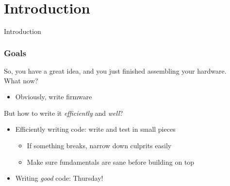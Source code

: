 \documentclass{beamer}
\begin{document}
\begin{frame}
\titlepage

\setcounter{tocdepth}{1}
\tableofcontents
\end{frame}

\section{Introduction} %
\begin{frame}
\centering \huge Introduction
\end{frame}

\begin{frame}
\frametitle{Goals}
So, you have a great idea, and you just finished assembling your hardware. \\
What now?
 {
\begin{itemize}
  \item Obviously, write firmware
\end{itemize}
\hfill\break
But how to write it \textit{efficiently} and \textit{well}?
}
 {
\begin{itemize}
  \item Efficiently writing code: write and test in small pieces
  \begin{itemize}
    \item If something breaks, narrow down culprits easily
    \item Make sure fundamentals are sane before building on top
  \end{itemize}
  \item Writing \textit{good} code: Thursday!
\end{itemize}
}
\end{frame}
\end{document}

